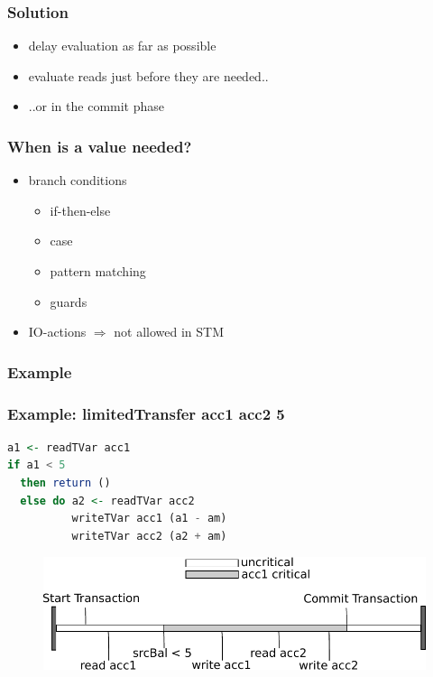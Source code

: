 \documentclass{beamer}
\begin{document}

  \begin{frame}
   \frametitle{Solution}
   \begin{itemize}\setlength\itemsep{1em}
    \item delay evaluation as far as possible
    \item evaluate reads just before they are needed..
    \item ..or in the commit phase
   \end{itemize}
  \end{frame}


  \begin{frame}
   \frametitle{When is a value needed?}
   \begin{itemize}\setlength\itemsep{1em}
    \item branch conditions
       \begin{itemize}
        \item if-then-else
        \item case
        \item pattern matching
        \item guards
       \end{itemize}
    \item IO-actions $\Rightarrow$ not allowed in STM
   \end{itemize}
  \end{frame}
  
  \begin{frame}
    \frametitle{Example}
       
  \end{frame}
  
  \begin{frame}[fragile]
   \frametitle{Example: limitedTransfer acc1 acc2 5}
   \begin{lstlisting}[language=Haskell]
a1 <- readTVar acc1
if a1 < 5
  then return ()
  else do a2 <- readTVar acc2
          writeTVar acc1 (a1 - am)
          writeTVar acc2 (a2 + am)
   \end{lstlisting}
   \pause
   \begin{figure}
    \includegraphics[scale=0.7]{ressources/lessCriticalValue.pdf}
   \end{figure}
\end{frame}
  
\end{document}
